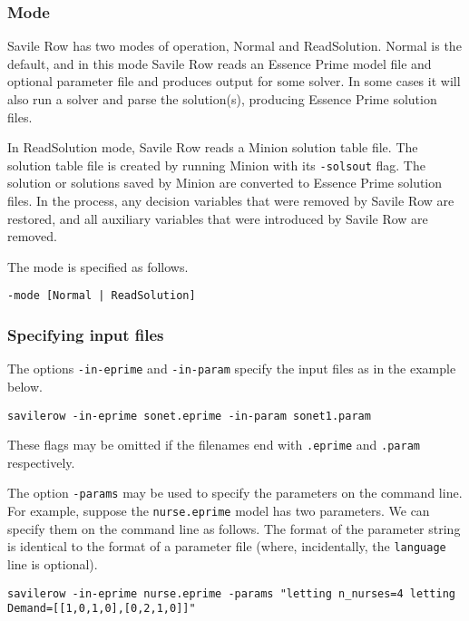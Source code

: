 \documentclass[a4paper]{article}
\newcommand{\eprime}{{\sc Essence Prime}\xspace}
\newcommand{\savilerow}{{\sc Savile Row}\xspace}
\begin{document}
\subsubsection{Mode}

\savilerow has two modes of operation, Normal and ReadSolution.  Normal is the
default, and in this mode \savilerow reads an \eprime model file and optional
parameter file and produces output for some solver. In some cases it will also 
run a solver and parse the solution(s), producing \eprime solution files. 

In ReadSolution mode, \savilerow reads a Minion solution table file. The solution
table file is created by running Minion with its \texttt{-solsout} flag.  The solution
or solutions saved by Minion are converted to \eprime solution files. In the process,
any decision variables that were removed by \savilerow are restored, and all 
auxiliary variables that were introduced by \savilerow are removed.  

The mode is specified as follows.

\begin{verbatim}
-mode [Normal | ReadSolution]
\end{verbatim}

\subsubsection{Specifying input files}

The options \texttt{-in-eprime} and \texttt{-in-param} specify the input files
as in the example below. 

\begin{verbatim}
savilerow -in-eprime sonet.eprime -in-param sonet1.param
\end{verbatim}

These flags may be omitted if the filenames end with \texttt{.eprime} and \texttt{.param} respectively. 

The option \texttt{-params} may be used to specify the parameters on the command
line. For example, suppose the \texttt{nurse.eprime} model has two parameters. We 
can specify them on the command line as follows. The format of the parameter string
is identical to the format of a parameter file (where, incidentally, the \texttt{language} line is optional).

{\footnotesize
\begin{verbatim}
savilerow -in-eprime nurse.eprime -params "letting n_nurses=4 letting Demand=[[1,0,1,0],[0,2,1,0]]"
\end{verbatim}}
\end{document}
